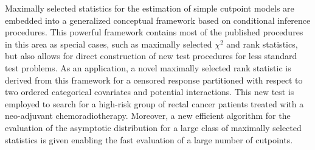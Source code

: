 Maximally selected statistics for the estimation of simple cutpoint models
are embedded into a generalized conceptual framework based on conditional inference
procedures. This powerful framework contains most of the published procedures
in this area as special cases, such as maximally selected $\chi^2$ and rank statistics, but
also allows for direct construction of new test procedures for less standard
test problems. As an application, a novel maximally selected rank statistic is derived from this
framework for a censored response partitioned with respect to two ordered
categorical covariates and potential interactions. This new test is employed
to search for a high-risk group of rectal cancer patients treated with a
neo-adjuvant chemoradiotherapy.
Moreover, a new efficient algorithm for the evaluation of the asymptotic distribution 
for a large class of maximally selected statistics is given enabling the
fast evaluation of a large number of cutpoints.

